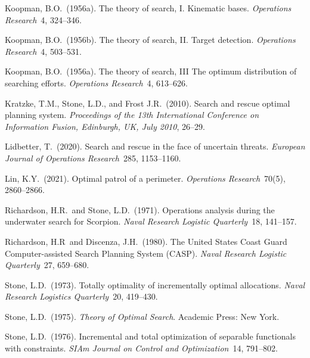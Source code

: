 \documentclass[12pt]{article}
\theoremstyle{plain}
\theoremstyle{definition}
\theoremstyle{remark}
\begin{document}
\begin{description}
\item{} Koopman, B.O.~(1956a). The theory of search, I. Kinematic bases. \emph{Operations Research}~4, 324--346. 


\item{} Koopman, B.O.~(1956b). The theory of search, II. Target detection. \emph{Operations Research}~4, 503--531. 


\item{} Koopman, B.O.~(1956a). The theory of search, III The optimum distribution of searching efforts. \emph{Operations Research}~4, 613--626. 

\item{} Kratzke, T.M., Stone, L.D., and Frost J.R.~(2010). Search and rescue optimal planning system.   \emph{Proceedings of the 13th International Conference on Information Fusion, Edinburgh, UK, July 2010}, 26--29.

\item{} Lidbetter, T.~(2020). Search and rescue in the face of uncertain threats. \emph{European Journal of Operations Research}~285, 1153--1160.

\item{} Lin, K.Y.~(2021). Optimal patrol of a perimeter. \emph{Operations Research}~70(5), 2860--2866.

\item{} Richardson, H.R.~and Stone, L.D.~(1971). Operations analysis during the underwater search for Scorpion. \emph{Naval Research Logistic Quarterly}~18, 141--157. 

\item{} Richardson, H.R~and Discenza, J.H.~(1980). The United States Coast Guard Computer-assisted Search Planning System (CASP). \emph{Naval Research Logistic Quarterly}~27,  659--680. 



\item{} Stone, L.D.~(1973). Totally optimality of incrementally optimal allocations. \emph{Naval Research Logistics Quarterly}~20, 419--430.

\item{} Stone, L.D.~(1975). \emph{Theory of Optimal Search}.  Academic Press: New York.


\item{} Stone, L.D.~(1976). Incremental and total optimization of separable functionals with constraints. \emph{SIAm Journal on Control and Optimization}~14,  791--802.


\end{description}
\end{document}
